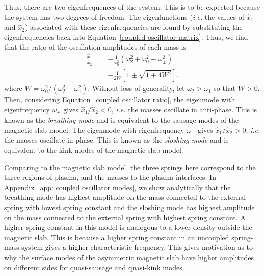 \documentclass[12pt,draft]{../style-files/ociamthesis}
\begin{document}
Thus, there are two eigenfrequences of the system. This is to be expected because the system has two degrees of freedom. The eigenfunctions (\textit{i.e.} the values of $\hat{x}_1$ and $\hat{x}_2$) associated with these eigenfrequencies are found by substituting the eigenfrequencies back into Equation~\eqref{coupled oscillator matrix}. Thus, we find that the ratio of the oscillation amplitudes of each mass is
\begin{align}
	\frac{\hat{x}_1}{\hat{x}_2} & = -\frac{1}{\omega_0^2}(\omega_2^2 + \omega_0^2 - \omega_\pm^2) \\
	& = -\frac{1}{2W}\left[1 \pm \sqrt{1 + 4W^2} \right]. \label{coupled oscillator ratio}
\end{align}
where $W = \omega_0^2 / (\omega_2^2 - \omega_1^2)$. Without loss of generality, let $\omega_2 > \omega_1$ so that $W > 0$. Then, considering Equation~\ref{coupled oscillator ratio}, the eigenmode with eigenfrequency $\omega_+$ gives $\hat{x}_1 / \hat{x}_2 < 0$, \textit{i.e.} the masses oscillate in anti-phase. This is known as the \textit{breathing mode} and is equivalent to the sausage modes of the magnetic slab model. The eigenmode with eigenfrequency $\omega_-$ gives $\hat{x}_1 / \hat{x}_2 > 0$, \textit{i.e.} the masses oscillate in phase. This is known as the \textit{sloshing mode} and is equivalent to the kink modes of the magnetic slab model.

Comparing to the magnetic slab model, the three springs here correspond to the three regions of plasma, and the masses to the plasma interfaces. In Appendix~\ref{app: coupled oscillator modes}, we show analytically that the breathing mode has highest amplitude on the mass connected to the external spring with lowest spring constant and the sloshing mode has highest amplitude on the mass connected to the external spring with highest spring constant. A higher spring constant in this model is analogous to a lower density outside the magnetic slab. This is because a higher spring constant in an uncoupled spring-mass system gives a higher characteristic frequency. This gives motivation as to why the surface modes of the asymmetric magnetic slab have higher amplitudes on different sides for quasi-sausage and quasi-kink modes.
\end{document}
